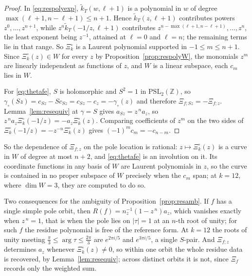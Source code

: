 \documentclass[11pt]{article}
\newcommand{\ZZ}{\mathbb{Z}}
\newcommand{\tk}{\widetilde{k}_T}
\begin{document}
\begin{proof}
In \eqref{eq:respolyexp}, $\tk(w,\ell+1)$ is a polynomial in $w$ of degree
$\max(\ell+1,n-\ell+1)\le n+1$. Hence $\tk(z,\ell+1)$ contributes powers $z^0,\dots,z^{n+1}$, while
$z^n\tk(-1/z,\ell+1)$ contributes $z^{n-\max(\ell+1,n-\ell+1)},\dots,z^n$, the least exponent being
$z^{-1}$, attained at $\ell=0$ and $\ell=n$; the remaining terms lie in that range. So $\Xi^\circ_k$ is a
Laurent polynomial supported in $-1\le m\le n+1$. Since $\Xi^\circ_k(z)\in W$ for every $z$ by
Proposition~\ref{prop:respolyW}, the monomials $z^m$ are linearly independent as functions of $z$,
and $W$ is a linear subspace, each $c_m$ lies in $W$.

For \eqref{eq:thetafe}, $S$ is holomorphic and $S^2=1$ in $\mathrm{PSL}_2(\ZZ)$, so
$\gamma_\circ(Sz)=c_{Sz}-Sc_{Sz}=c_{Sz}-c_z=-\gamma_\circ(z)$ and therefore
$\Xi_{f;Sz}=-\Xi_{f;z}$. Lemma~\ref{lem:resequiv} at $\gamma=S$ gives $a_{Sz}=z^{\,n}a_z$, so
$z^{\,n}a_z\Xi^\circ_k(-1/z)=-a_z\Xi^\circ_k(z)$. Comparing coefficients of $z^{m}$ on the two sides of
$\Xi^\circ_k(-1/z)=-z^{-n}\Xi^\circ_k(z)$ gives $(-1)^mc_m=-c_{n-m}$.
\end{proof}

So the dependence of $\Xi_{f;z}$ on the pole location is rational: $z\mapsto\Xi^\circ_k(z)$ is a curve in
$W$ of degree at most $n+2$, and \eqref{eq:thetafe} is an involution on it. Its coordinate functions
in any basis of $W$ are Laurent polynomials in $z$, so the curve is contained in no proper subspace
of $W$ precisely when the $c_m$ span; at $k=12$, where $\dim W=3$, they are computed to do so.

Two consequences for the ambiguity of Proposition~\ref{prop:resamb}. If $f$ has a single simple pole
orbit, then $R(f)=n_z^{-1}(1-z^{\,n})a_z$, which vanishes exactly when $z^{\,n}=1$, that is when the
pole lies on $|\tau|=1$ at an $n$-th root of unity; for such $f$ the residue polynomial is free of
the reference form. At $k=12$ the roots of unity meeting
$\tfrac{\pi}{3}\le\arg\tau\le\tfrac{2\pi}{3}$ are $e^{2\pi i/5}$ and $e^{3\pi i/5}$, a single
$S$-pair. And $\Xi_{f;z}$ determines $a_z$ whenever $\Xi^\circ_k(z)\neq0$, so within one orbit the whole
residue data is recovered, by Lemma~\ref{lem:resequiv}; across distinct orbits it is not, since
$\Xi_f$ records only the weighted sum.
\end{document}
